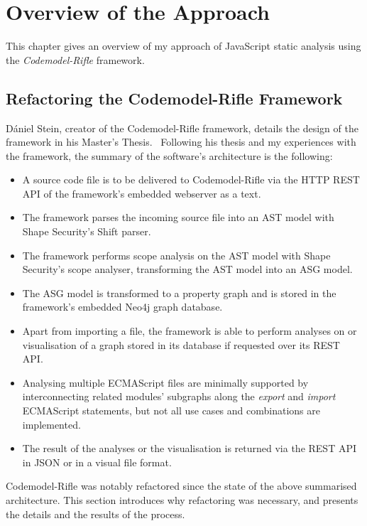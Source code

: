 \chapter{Overview of the Approach}

This chapter gives an overview of my approach of JavaScript static analysis using the \emph{Codemodel-Rifle} framework.


\section{Refactoring the Codemodel-Rifle Framework}

Dániel Stein, creator of the Codemodel-Rifle framework, details the design of the framework in his Master's Thesis.~\cite{stein-daniel-msc} Following his thesis and my experiences with the framework, the summary of the software's architecture is the following:

\begin{itemize}
\item A source code file is to be delivered to Codemodel-Rifle via the HTTP REST API of the framework's embedded webserver as a text.
\item The framework parses the incoming source file into an AST model with Shape Security's Shift parser.
\item The framework performs scope analysis on the AST model with Shape Security's scope analyser, transforming the AST model into an ASG model.
\item The ASG model is transformed to a property graph and is stored in the framework's embedded Neo4j graph database.
\item Apart from importing a file, the framework is able to perform analyses on or visualisation of a graph stored in its database if requested over its REST API.
\item Analysing multiple ECMAScript files are minimally supported by interconnecting related modules' subgraphs along the \emph{export} and \emph{import} ECMAScript statements, but not all use cases and combinations are implemented.
\item The result of the analyses or the visualisation is returned via the REST API in JSON or in a visual file format.
\end{itemize}

Codemodel-Rifle was notably refactored since the state of the above summarised architecture. This section introduces why refactoring was necessary, and presents the details and the results of the process.


